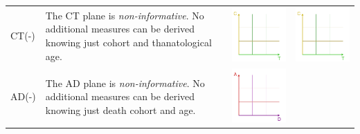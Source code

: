 \documentclass[12pt,oneside,a4paper]{article} %
\begin{document}
\begin{longtable}{m{}m{}m{}m{}}
  CT(-) &
  The CT plane is \emph{non-informative}. No additional measures can be derived knowing just cohort and thanatological age. &
  \includegraphics[scale=.5]{Figures/DiagramTable/CT_rt.pdf} &
  \includegraphics[scale=.5]{Figures/DiagramTable/CT_rt.pdf} \\
  AD(-) &
  The AD plane is \emph{non-informative}. No additional measures can be derived
  knowing just death cohort and age. & \includegraphics[scale=.5]{Figures/DiagramTable/AD_rt.pdf} &

\end{longtable}
\end{document}
